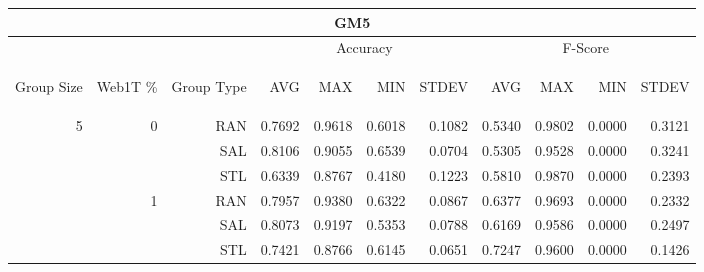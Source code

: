 \begin{center}
\begin{table}[htbp]
\begin{tabular}{ | r | r | r | r | r | r | r | r | r | r | r |}
\hline
\multicolumn{11}{|c|}{GM5}\\
\hline
 & & & \multicolumn{4}{|c|}{Accuracy} & \multicolumn{4}{|c|}{F-Score}\\ \cline{4-11}
\begin{sideways}Group Size\end{sideways} & \begin{sideways}Web1T \%\end{sideways} & \begin{sideways}Group Type\end{sideways} & \begin{sideways}AVG\end{sideways} & \begin{sideways}MAX\end{sideways} & \begin{sideways}MIN\end{sideways} & \begin{sideways}STDEV\end{sideways} & \begin{sideways}AVG\end{sideways} & \begin{sideways}MAX\end{sideways} & \begin{sideways}MIN\end{sideways} & \begin{sideways}STDEV\end{sideways}\\
\hline
\multirow{18}{*}{5}
 & \multirow{3}{*}{0} & RAN & 0.7692 & 0.9618 & 0.6018 & 0.1082 & 0.5340 & 0.9802 & 0.0000 & 0.3121\\ \cline{3-11}
 &   & SAL & 0.8106 & 0.9055 & 0.6539 & 0.0704 & 0.5305 & 0.9528 & 0.0000 & 0.3241\\ \cline{3-11}
 &   & STL & 0.6339 & 0.8767 & 0.4180 & 0.1223 & 0.5810 & 0.9870 & 0.0000 & 0.2393\\ \cline{2-11}
 & \multirow{3}{*}{1} & RAN & 0.7957 & 0.9380 & 0.6322 & 0.0867 & 0.6377 & 0.9693 & 0.0000 & 0.2332\\ \cline{3-11}
 &   & SAL & 0.8073 & 0.9197 & 0.5353 & 0.0788 & 0.6169 & 0.9586 & 0.0000 & 0.2497\\ \cline{3-11}
 &   & STL & 0.7421 & 0.8766 & 0.6145 & 0.0651 & 0.7247 & 0.9600 & 0.0000 & 0.1426\\ \cline{2-11}

\end{tabular}
\end{table}
\end{center}
